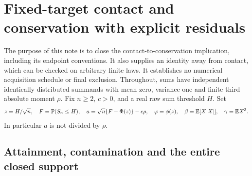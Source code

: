 \section{Fixed-target contact and conservation with explicit residuals}
\label{v8con:section}

The purpose of this note is to close the contact-to-conservation implication,
including its endpoint conventions. It also supplies an identity away from
contact, which can be checked on arbitrary finite laws. It establishes no
numerical acquisition schedule or final exclusion. Throughout, sums have
independent identically distributed summands with mean zero, variance one
and finite third absolute moment $\rho$. Fix $n\ge2$, $c>0$, and a real
raw sum threshold $H$. Set
\[
 z=H/\sqrt n,\quad F=\mathbb P(S_n\le H),\quad
 a=\sqrt n\{F-\Phi(z)\}-c\rho,
 \quad\varphi=\phi(z),\quad\beta=\mathbb E[X|X|],\quad\gamma=\mathbb E X^3.
\]
In particular $a$ is not divided by $\rho$.

\subsection{Attainment, contamination and the entire closed support}

